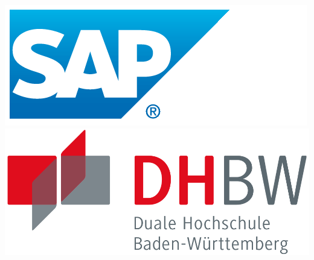 \thispagestyle{empty}

\includegraphics[scale=0.5]{grafiken/sap_logo.png} \hfill \includegraphics[scale=0.2]{grafiken/dhbw_logo.png} \\

